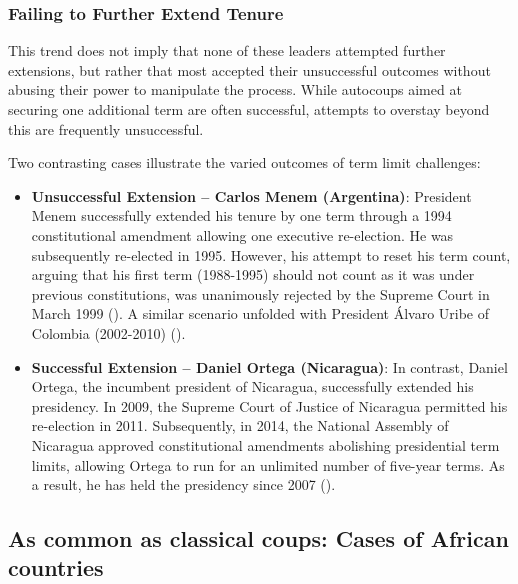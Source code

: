 \documentclass[
  12pt,
]{report}
\begin{document}
\subsubsection*{Failing to Further Extend
Tenure}\label{failing-to-further-extend-tenure}

This trend does not imply that none of these leaders attempted further
extensions, but rather that most accepted their unsuccessful outcomes
without abusing their power to manipulate the process. While autocoups
aimed at securing one additional term are often successful, attempts to
overstay beyond this are frequently unsuccessful.

Two contrasting cases illustrate the varied outcomes of term limit
challenges:

\begin{itemize}
\item
  \textbf{Unsuccessful Extension -- Carlos Menem (Argentina)}: President
  Menem successfully extended his tenure by one term through a 1994
  constitutional amendment allowing one executive re-election. He was
  subsequently re-elected in 1995. However, his attempt to reset his
  term count, arguing that his first term (1988-1995) should not count
  as it was under previous constitutions, was unanimously rejected by
  the Supreme Court in March 1999 (). A similar scenario unfolded with President Álvaro Uribe of
  Colombia (2002-2010) ().
\item
  \textbf{Successful Extension -- Daniel Ortega (Nicaragua)}: In
  contrast, Daniel Ortega, the incumbent president of Nicaragua,
  successfully extended his presidency. In 2009, the Supreme Court of
  Justice of Nicaragua permitted his re-election in 2011. Subsequently,
  in 2014, the National Assembly of Nicaragua approved constitutional
  amendments abolishing presidential term limits, allowing Ortega to run
  for an unlimited number of five-year terms. As a result, he has held
  the presidency since 2007 ().
\end{itemize}

\subsection{As common as classical coups: Cases of African
countries}\label{as-common-as-classical-coups-cases-of-african-countries}
\end{document}
